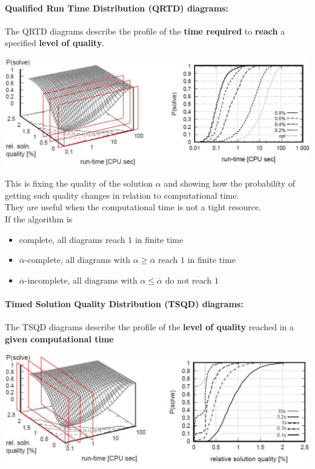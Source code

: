 \newpage

\paragraph{Qualified Run Time Distribution (QRTD) diagrams:} The QRTD diagrams describe the profile of the \textbf{time required} to \textbf{reach} a specified \textbf{level of quality}.
\begin{center}
	\includegraphics[width=\columnwidth]{img/QRTD1}
\end{center}

This is fixing the quality of the solution $\alpha$ and showing how the probability of getting such quality changes in relation to computational time.\\

They are useful when the computational time is not a tight resource.\\

If the algorithm is
\begin{itemize}
	\item complete, all diagrams reach $1$ in finite time
	\item $\overline{\alpha}$-complete, all diagrams with $\alpha \geq \overline{\alpha}$ reach $1$ in finite time
	\item $\overline{\alpha}$-incomplete, all diagrams with $\alpha \leq \overline{\alpha}$ do not reach $1$
\end{itemize}

\newpage

\paragraph{Timed Solution Quality Distribution (TSQD) diagrams:} The TSQD diagrams describe the profile of the \textbf{level of quality} reached in a \textbf{given computational time}
\begin{center}
	\includegraphics[width=\columnwidth]{img/TSQD1}
\end{center}

